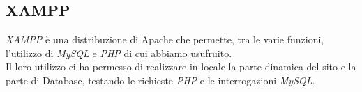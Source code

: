 \subsection{XAMPP}
\emph{XAMPP} è una distribuzione di Apache che permette, tra le varie funzioni, l'utilizzo di \emph{MySQL} e \emph{PHP} di cui abbiamo usufruito.\\
Il loro utilizzo ci ha permesso di realizzare in locale la parte dinamica del sito e la parte di Database, testando le richieste \emph{PHP} e le interrogazioni \emph{MySQL}.